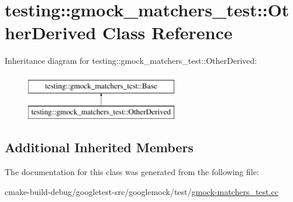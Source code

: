 \hypertarget{classtesting_1_1gmock__matchers__test_1_1OtherDerived}{}\section{testing\+::gmock\+\_\+matchers\+\_\+test\+::Other\+Derived Class Reference}
\label{classtesting_1_1gmock__matchers__test_1_1OtherDerived}
Inheritance diagram for testing\+::gmock\+\_\+matchers\+\_\+test\+::Other\+Derived\+:\begin{figure}[H]
\begin{center}
\leavevmode
\includegraphics[height=2.000000cm]{classtesting_1_1gmock__matchers__test_1_1OtherDerived}
\end{center}
\end{figure}
\subsection*{Additional Inherited Members}


The documentation for this class was generated from the following file\+:\begin{DoxyCompactItemize}
\item 
cmake-\/build-\/debug/googletest-\/src/googlemock/test/\mbox{\hyperlink{gmock-matchers__test_8cc}{gmock-\/matchers\+\_\+test.\+cc}}\end{DoxyCompactItemize}
